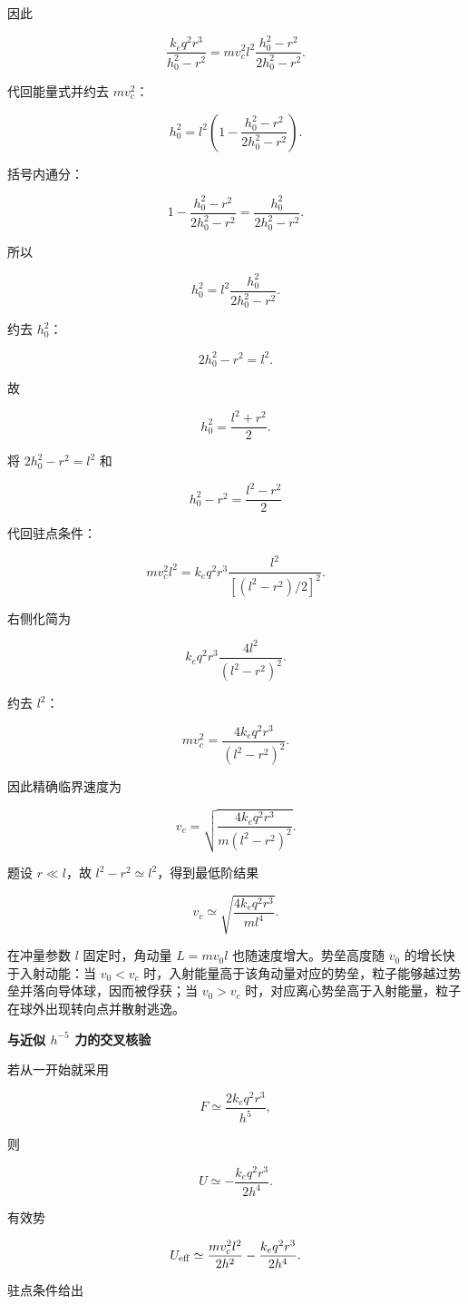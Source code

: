 \documentclass[12pt,a4paper,UTF8]{ctexart}
\begin{document}
因此

\[
\frac{k_eq^2r^3}{h_0^2-r^2}
=mv_c^2l^2\frac{h_0^2-r^2}{2h_0^2-r^2}.
\]

代回能量式并约去 \(mv_c^2\)：

\[
h_0^2=l^2\left(1-\frac{h_0^2-r^2}{2h_0^2-r^2}\right).
\]

括号内通分：

\[
1-\frac{h_0^2-r^2}{2h_0^2-r^2}
=\frac{h_0^2}{2h_0^2-r^2}.
\]

所以

\[
h_0^2=l^2\frac{h_0^2}{2h_0^2-r^2}.
\]

约去 \(h_0^2\)：

\[
2h_0^2-r^2=l^2.
\]

故

\[
\boxed{h_0^2=\frac{l^2+r^2}{2}}.
\]

将 \(2h_0^2-r^2=l^2\) 和

\[h_0^2-r^2=\frac{l^2-r^2}{2}\]

代回驻点条件：

\[
mv_c^2l^2
=k_eq^2r^3\frac{l^2}{[(l^2-r^2)/2]^2}.
\]

右侧化简为

\[
k_eq^2r^3\frac{4l^2}{(l^2-r^2)^2}.
\]

约去 \(l^2\)：

\[
mv_c^2=\frac{4k_eq^2r^3}{(l^2-r^2)^2}.
\]

因此精确临界速度为

\[
\boxed{
v_c=\sqrt{\frac{4k_eq^2r^3}{m(l^2-r^2)^2}}
}.
\]

题设 \(r\ll l\)，故 \(l^2-r^2\simeq l^2\)，得到最低阶结果

\[
\boxed{
v_c\simeq\sqrt{\frac{4k_eq^2r^3}{ml^4}}
}.
\]

在冲量参数 \(l\) 固定时，角动量 \(L=mv_0l\) 也随速度增大。势垒高度随
\(v_0\) 的增长快于入射动能：当 \(v_0<v_c\)
时，入射能量高于该角动量对应的势垒，粒子能够越过势垒并落向导体球，因而被俘获；当
\(v_0>v_c\)
时，对应离心势垒高于入射能量，粒子在球外出现转向点并散射逃逸。

\textbf{与近似 \(h^{-5}\) 力的交叉核验}

若从一开始就采用

\[F\simeq\frac{2k_eq^2r^3}{h^5},\]

则

\[U\simeq-\frac{k_eq^2r^3}{2h^4}.\]

有效势

\[U_{\rm eff}\simeq\frac{mv_c^2l^2}{2h^2}-\frac{k_eq^2r^3}{2h^4}.\]

驻点条件给出
\end{document}
